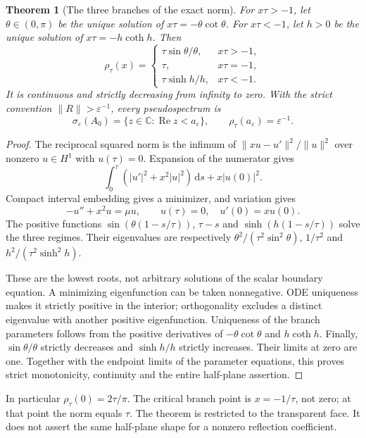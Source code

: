 \documentclass[10pt]{article}
\newcommand{\dd}{\,\mathrm d}
\newcommand{\C}{\mathbb C}
\DeclareMathOperator{\Ree}{Re}
\newtheorem{theorem}{Theorem}
\begin{document}
\begin{theorem}[The three branches of the exact norm]
For $x\tau>-1$, let $\theta\in(0,\pi)$ be the unique solution of
$x\tau=-\theta\cot\theta$. For $x\tau<-1$, let $h>0$ be the unique
solution of $x\tau=-h\coth h$. Then
\begin{equation}
 \rho_\tau(x)=
 \begin{cases}
 \tau\sin\theta/\theta,&x\tau>-1,\\
 \tau,&x\tau=-1,\\
 \tau\sinh h/h,&x\tau<-1.
 \end{cases}
 \label{eq:norm}
\end{equation}
It is continuous and strictly decreasing from infinity to zero.
With the strict convention $\|R\|>\varepsilon^{-1}$, every pseudospectrum is
\begin{equation}
 \sigma_\varepsilon(A_0)=\{z\in\C:\Ree z<a_\varepsilon\},\qquad
 \rho_\tau(a_\varepsilon)=\varepsilon^{-1}.
\end{equation}
\end{theorem}
\begin{proof}
The reciprocal squared norm is the infimum of
$\|xu-u'\|^2/\|u\|^2$ over nonzero $u\in H^1$ with $u(\tau)=0$.
Expansion of the numerator gives
\begin{equation}
 \int_0^\tau(|u'|^2+x^2|u|^2)\dd s+x|u(0)|^2.
\end{equation}
Compact interval embedding gives a minimizer, and variation gives
\begin{equation}
 -u''+x^2u=\mu u,\qquad u(\tau)=0,\quad u'(0)=xu(0).
 \label{eq:sl}
\end{equation}
The positive functions $\sin(\theta(1-s/\tau))$,
$\tau-s$ and $\sinh(h(1-s/\tau))$ solve the three regimes.
Their eigenvalues are respectively
$\theta^2/(\tau^2\sin^2\theta)$, $1/\tau^2$ and
$h^2/(\tau^2\sinh^2h)$.

These are the lowest roots, not arbitrary solutions of the scalar boundary
equation. A minimizing eigenfunction can be taken nonnegative. ODE uniqueness
makes it strictly positive in the interior; orthogonality excludes a distinct
eigenvalue with another positive eigenfunction. Uniqueness of the branch
parameters follows from the positive derivatives of
$-\theta\cot\theta$ and $h\coth h$.
Finally, $\sin\theta/\theta$ strictly decreases and $\sinh h/h$ strictly
increases. Their limits at zero are one. Together with the endpoint limits
of the parameter equations, this proves strict monotonicity, continuity and
the entire half-plane assertion.
\end{proof}
In particular $\rho_\tau(0)=2\tau/\pi$. The critical branch point is
$x=-1/\tau$, not zero; at that point the norm equals $\tau$.
The theorem is restricted to the transparent face. It does not assert the
same half-plane shape for a nonzero reflection coefficient.
\fi
\end{document}
